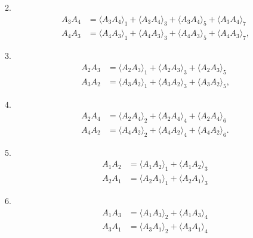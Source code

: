 \documentclass[aps, preprint]{revtex4}
\begin{document}
2.
\begin{align}A_{3} A_{4} &  = \langle A_{3} A_{4} \rangle _{1} + \langle A_{3} A_{4} \rangle _{3} + \langle A_{3} A_{4} \rangle _{5} + \langle A_{3} A_{4} \rangle _{7} \\
A_{4} A_{3} &  = \langle A_{4} A_{3} \rangle _{1} + \langle A_{4} A_{3} \rangle _{3} + \langle A_{4} A_{3} \rangle _{5} + \langle A_{4} A_{3} \rangle _{7}\text{,}\end{align}

3.
\begin{align}A_{2} A_{3} &  = \langle A_{2} A_{3} \rangle _{1} + \langle A_{2} A_{3} \rangle _{3} + \langle A_{2} A_{3} \rangle _{5} \\
A_{3} A_{2} &  = \langle A_{3} A_{2} \rangle _{1} + \langle A_{3} A_{2} \rangle _{3} + \langle A_{3} A_{2} \rangle _{5}\text{,}\end{align}

4.
\begin{align}A_{2} A_{4} &  = \langle A_{2} A_{4} \rangle _{2} + \langle A_{2} A_{4} \rangle _{4} + \langle A_{2} A_{4} \rangle _{6} \\
A_{4} A_{2} &  = \langle A_{4} A_{2} \rangle _{2} + \langle A_{4} A_{2} \rangle _{4} + \langle A_{4} A_{2} \rangle _{6}\text{.}\end{align}

5.
\begin{align}A_{1} A_{2} &  = \langle A_{1} A_{2} \rangle _{1} + \langle A_{1} A_{2} \rangle _{3} \\
A_{2} A_{1} &  = \langle A_{2} A_{1} \rangle _{1} + \langle A_{2} A_{1} \rangle _{3}\end{align}

6.
\begin{align}A_{1} A_{3} &  = \langle A_{1} A_{3} \rangle _{2} + \langle A_{1} A_{3} \rangle _{4} \\
A_{3} A_{1} &  = \langle A_{3} A_{1} \rangle _{2} + \langle A_{3} A_{1} \rangle _{4}\end{align}
\end{document}
